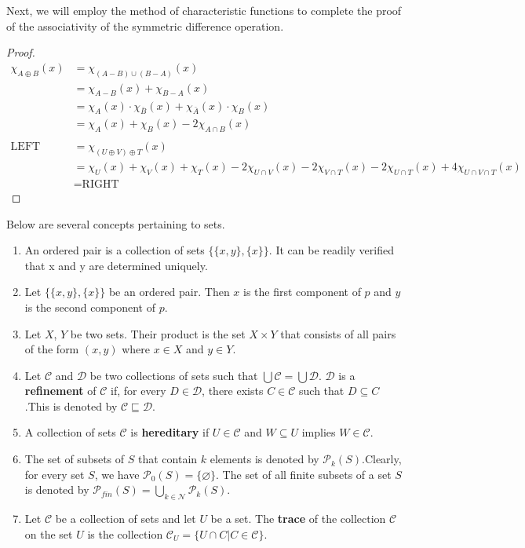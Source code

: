 \documentclass[../main.tex]{subfiles}
\begin{document}
Next, we will employ the method of characteristic functions to complete the proof of the associativity of the symmetric difference operation.

\begin{proof}
\begin{align*}
    \chi_{A\oplus B}(x)&=\chi_{(A-B)\cup(B-A)}(x)\\
    &=\chi_{A-B}(x)+\chi_{B-A}(x)\\
    &=\chi_{A}(x)\cdot\chi_{\bar B}(x)+\chi_{\bar A}(x)\cdot\chi_{B}(x)\\
    &=\chi_A(x)+\chi_B(x)-2\chi_{A\cap B}(x)\\
    \\
    \text{LEFT}&=\chi_{(U\oplus V)\oplus T}(x)\\
    &=\chi_U(x)+\chi_V(x)+\chi_T(x)-2\chi_{U\cap V}(x)-2\chi_{V\cap T}(x)-2\chi_{U\cap T}(x)+4\chi_{U\cap V \cap T}(x)\\
    &=\text{RIGHT}
\end{align*}
\end{proof}


\begin{purple}
\begin{definition}
    Below are several concepts pertaining to sets.

\begin{enumerate}
    \item An ordered pair is a collection of sets $\{\{x,y\},\{x\}\}$. It can be readily verified that x and y are determined uniquely.
    \item Let $\{\{x,y\},\{x\}\}$ be an ordered pair. Then $x$ is the first component of $p$ and $y$ is the second component of $p$.
    \item Let $X$, $Y$ be two sets. Their product is the set $X\times Y$ that consists of all pairs of the form $(x, y)$ where $x\in X$ and $y \in Y$.
    \item Let $\mathcal{C}$ and $\mathcal{D}$ be two collections of sets such that $\bigcup \mathcal{C}=\bigcup \mathcal{D}$. $\mathcal{D}$ is a \textbf{refinement} of $\mathcal{C}$ if, for every $D\in\mathcal{D}$, there exists $C\in\mathcal{C}$ such that $D\subseteq C$.This is denoted by $\mathcal{C}\sqsubseteq \mathcal{D}$.
    \item A collection of sets $\mathcal{C}$ is \textbf{hereditary} if $U\in\mathcal{C}$ and $W \subseteq U$ implies $W\in \mathcal{C}$.
    \item The set of subsets of $S$ that contain $k$ elements is denoted by $\mathcal{P}_k(S)$.Clearly, for every set $S$, we have $\mathcal{P}_0(S)=\{\varnothing\}$. The set of all finite subsets of a set $S$ is denoted by $\mathcal{P}_{fin}(S)=\bigcup_{k\in \mathcal{N}}\mathcal{P}_k(S)$.
    \item Let $\mathcal{C}$ be a collection of sets and let $U$ be a set. The \textbf{trace} of the collection $\mathcal{C}$ on the set $U$ is the collection $\mathcal{C}_U=\{U\cap C| C\in \mathcal{C}\}$.
\end{enumerate}
\end{definition}
\end{purple}
\end{document}
